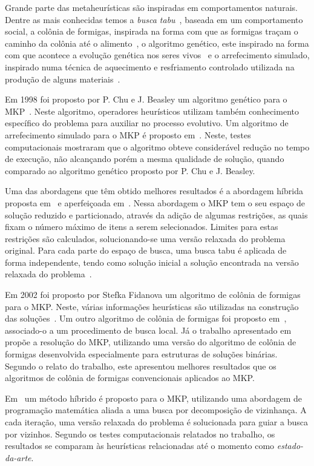 \documentclass[brazil]{article}
\begin{document}
Grande parte das metaheurísticas são inspiradas em comportamentos na\-tu\-rais.
Dentre as mais conhecidas temos a \textit{busca tabu}~\cite{Glover-2003},
baseada em um comportamento social, a colônia de formigas, inspirada na
forma com que as formigas traçam o caminho da colônia até o alimento~\cite{Dorigo-1991},
o algoritmo genético, este inspirado na forma com que acontece a evolução genética
nos seres vivos~\cite{Holland-1975} e o ar\-re\-fe\-ci\-men\-to simulado, inspirado numa
téc\-ni\-ca de aquecimento e resfriamento controlado utilizada na produção de
alguns ma\-te\-ri\-ais~\cite{Kirkpatrick-1983}.

Em 1998 foi proposto por P. Chu e J. Beasley um algoritmo genético para o MKP~\cite{Chu-Beasley-1998}.
Neste algoritmo, operadores heurísticos utilizam também conhecimento específico
do problema para auxiliar no processo evolutivo.
Um algoritmo de arrefecimento simulado para o MKP é proposto em~\cite{Qian2007}.
Neste, testes computacionais mostraram que o algoritmo obteve considerável redução
no tempo de execução, não alcançando porém a mesma
qualidade de solução, quando comparado ao algoritmo genético proposto por P. Chu e J. Beasley.

Uma das abordagens que têm obtido me\-lho\-res resultados é a abordagem híbrida
proposta em~\cite{Vasquez2001} e aperfeiçoada em~\cite{Vasquez2005}.
Nessa abordagem o MKP tem o seu espaço de solução reduzido e particionado,
através da adição de algumas restrições, as quais fixam o número má\-xi\-mo
de itens a serem selecionados.
Limites para estas restrições são calculados, solucionando-se uma versão relaxada
do problema original.
Para cada parte do espaço de busca, uma busca tabu é aplicada de forma independente,
tendo como solução inicial a solução encontrada na versão relaxada do pro\-ble\-ma~\cite{Puchinger2010}.

Em 2002 foi proposto por Stefka Fidanova um algoritmo de colônia de formigas
para o MKP. Neste, várias informações heurísticas são utilizadas na cons\-tru\-ção
das soluções~\cite{Fidanova2002}.
Um outro algoritmo de colônia de formigas foi proposto em~\cite{Liangjun2008},
associado-o a um procedimento de busca local.
Já o trabalho apresentado em~\cite{Kong2008} propõe a resolução do MKP, utilizando
uma versão do algoritmo de colônia de formigas desenvolvida especialmente
para estruturas de soluções binárias.
Segundo o relato do trabalho, este apresentou melhores resultados que
os algoritmos de colônia de formigas convencionais aplicados ao MKP.

Em~\cite{Hanafi2010} um método híbrido é proposto para o MKP, utilizando
uma abordagem de programação matemática aliada a uma busca por decomposição
de vizinhança.
A cada iteração, uma versão relaxada do problema é solucionada para
guiar a busca por vizinhos.
Segundo os testes computacionais relatados no trabalho, os resultados
se comparam às heurísticas relacionadas até o momento como \textit{estado-da-arte}.
\end{document}
